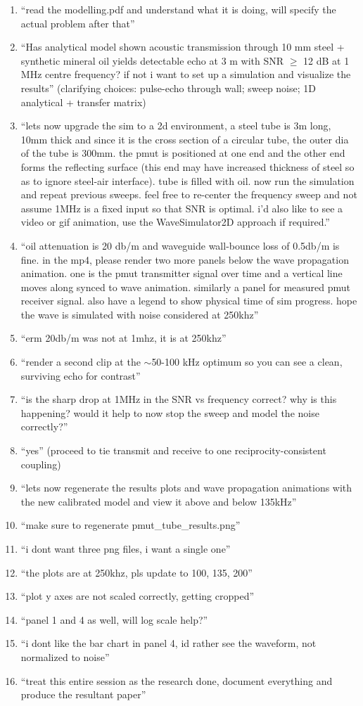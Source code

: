 \begin{enumerate}\itemsep1pt
\item ``read the modelling.pdf and understand what it is doing, will specify the actual problem after that''
\item ``Has analytical model shown acoustic transmission through 10 mm steel + synthetic mineral oil yields detectable echo at 3 m with SNR $\geq$ 12 dB at 1 MHz centre frequency? if not i want to set up a simulation and visualize the results'' (clarifying choices: pulse-echo through wall; sweep noise; 1D analytical + transfer matrix)
\item ``lets now upgrade the sim to a 2d environment, a steel tube is 3m long, 10mm thick and since it is the cross section of a circular tube, the outer dia of the tube is 300mm. the pmut is positioned at one end and the other end forms the reflecting surface (this end may have increased thickness of steel so as to ignore steel-air interface). tube is filled with oil. now run the simulation and repeat previous sweeps. feel free to re-center the frequency sweep and not assume 1MHz is a fixed input so that SNR is optimal. i'd also like to see a video or gif animation, use the WaveSimulator2D approach if required.''
\item ``oil attenuation is 20 db/m and waveguide wall-bounce loss of 0.5db/m is fine. in the mp4, please render two more panels below the wave propagation animation. one is the pmut transmitter signal over time and a vertical line moves along synced to wave animation. similarly a panel for measured pmut receiver signal. also have a legend to show physical time of sim progress. hope the wave is simulated with noise considered at 250khz''
\item ``erm 20db/m was not at 1mhz, it is at 250khz''
\item ``render a second clip at the $\sim$50-100 kHz optimum so you can see a clean, surviving echo for contrast''
\item ``is the sharp drop at 1MHz in the SNR vs frequency correct? why is this happening? would it help to now stop the sweep and model the noise correctly?''
\item ``yes'' (proceed to tie transmit and receive to one reciprocity-consistent coupling)
\item ``lets now regenerate the results plots and wave propagation animations with the new calibrated model and view it above and below 135kHz''
\item ``make sure to regenerate pmut\_tube\_results.png''
\item ``i dont want three png files, i want a single one''
\item ``the plots are at 250khz, pls update to 100, 135, 200''
\item ``plot y axes are not scaled correctly, getting cropped''
\item ``panel 1 and 4 as well, will log scale help?''
\item ``i dont like the bar chart in panel 4, id rather see the waveform, not normalized to noise''
\item ``treat this entire session as the research done, document everything and produce the resultant paper''
\end{enumerate}

